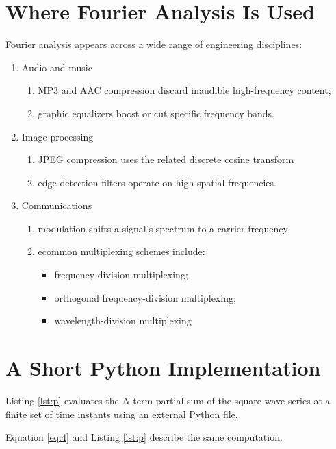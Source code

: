 \documentclass[a4paper,11pt]{article}
\begin{document}
\section{Where Fourier Analysis Is Used}
Fourier analysis appears across a wide range of engineering disciplines:
\begin{enumerate}[label=$\oplus$]
    \item Audio and music
    \begin{enumerate}[label=$\oplus$]
        \item MP3 and AAC compression discard inaudible high-frequency content;
        \item  graphic equalizers boost or cut specific frequency bands.
    \end{enumerate}
    \item  Image processing
        \begin{enumerate}[label=$\oplus$]
        \item JPEG compression uses the related discrete cosine transform
        \item  edge detection filters operate on high spatial frequencies.
        \end{enumerate}
    \item  Communications
    \begin{enumerate}[label=$\oplus$]
        \item modulation shifts a signal’s spectrum to a carrier frequency
        \item  ecommon multiplexing schemes include:
        \begin{itemize}[label=$\triangleright$]
                \item frequency-division multiplexing;
                \item   orthogonal frequency-division multiplexing;
              \item  wavelength-division multiplexing
        \end{itemize}
    \end{enumerate}
    
\end{enumerate}
\section{ A Short Python Implementation}
Listing \ref{lst:p} evaluates the $N$-term partial sum of the square wave series at a finite set of time
instants using an external Python file.

Equation \eqref{eq:4} and Listing \ref{lst:p} describe the same computation.

\end{document}
